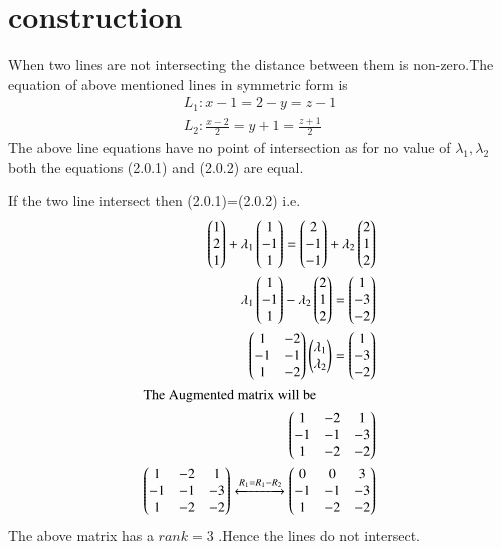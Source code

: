 \documentclass[journal,12pt,twocolumn]{IEEEtran}
\newcommand{\myvec}[1]{\ensuremath{\begin{pmatrix}#1\end{pmatrix}}}
\numberwithin{equation}{subsection}
\begin{document}
\section{construction}
When two lines are not intersecting the distance between them is non-zero.The equation of above mentioned lines in symmetric form is
\begin{align}
    L_1\colon x-1=2-y=z-1\\
    L_2\colon \frac{x-2}{2}=y+1=\frac{z+1}{2}
\end{align}
The above line equations have no point of intersection as for no value of $\lambda_1,\lambda_2$ both the equations (2.0.1) and (2.0.2) are equal.\par
If the two line intersect then (2.0.1)=(2.0.2) i.e.
\begin{align}
    \myvec{1\\2\\1}+\lambda_1\myvec{1\\-1\\1}=\myvec{2\\-1\\-1}+\lambda_2\myvec{2\\1\\2}\\
    \lambda_1\myvec{1\\-1\\1}-\lambda_2\myvec{2\\1\\2}=\myvec{1\\-3\\-2}\\
    \myvec{1 & -2\\-1 & -1\\1 & -2}\myvec{\lambda_1\\\lambda_2}=\myvec{1\\-3\\-2}\\
    \intertext{The Augmented matrix will be}
    \myvec{1 & -2 & 1\\-1 & -1 & -3\\1 & -2 & -2}\\
    \myvec{1 & -2 & 1\\-1 & -1 & -3\\1 & -2 & -2}\xleftrightarrow{R_1=R_1-R_2}\myvec{0 & 0 & 3\\-1 & -1 & -3\\1 & -2 & -2}
\end{align}
The above matrix has a $rank=3$ .Hence the lines do not intersect.
\end{document}
